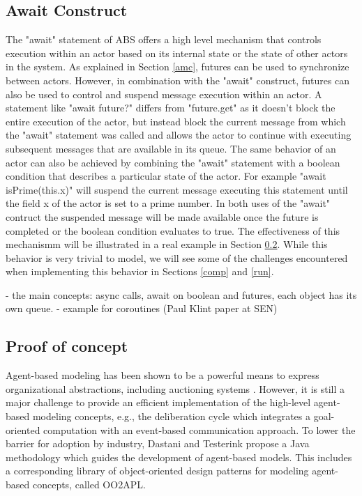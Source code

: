 \subsection{Await Construct}
The "await" statement of ABS offers a high level mechanism that controls execution within an actor based on its internal state or the state of other actors in the system. As explained in Section \ref{amc}, futures can be used to synchronize between actors. However, in combination with the "await" construct, futures can also be used to control and suspend message execution within an actor. A statement like "await future?" differs from "future.get" as it doesn't block the entire execution of the actor, but instead block the current message from which the "await" statement was called and allows the actor to continue with executing subsequent messages that are available in its queue. The same behavior of an actor can also be achieved by combining the "await" statement with a boolean condition that describes a particular state of the actor. For example "await isPrime(this.x)" will suspend the current message executing this statement until the field x of the actor is set to a prime number. In both uses of the "await" contruct the suspended message will be made available once the future is completed or the boolean condition evaluates to true. The effectiveness of this mechanismm will be illustrated in a real example in Section \ref{ag}. While this behavior is very trivial to model, we will see some of the challenges encountered when implementing this behavior in Sections \ref{comp} and \ref{run}.        

- the main concepts: async calls, await on boolean and futures, each object has its own queue.
- example for coroutines (Paul Klint paper at SEN)

\subsection{Proof of concept}
\label{ag}

Agent-based modeling has been shown to be a powerful means to express organizational abstractions, including auctioning systems \cite{agent_auction,bas16}.
However, it is still a major challenge to provide an efficient implementation of the high-level agent-based modeling concepts, e.g., the deliberation cycle which integrates a goal-oriented computation with an event-based communication approach. 
To lower the barrier for adoption by industry, Dastani and Testerink \cite{bas16} propose a Java methodology which guides the development of agent-based models. 
This includes a corresponding library of object-oriented design patterns for modeling agent-based concepts, called OO2APL. 

